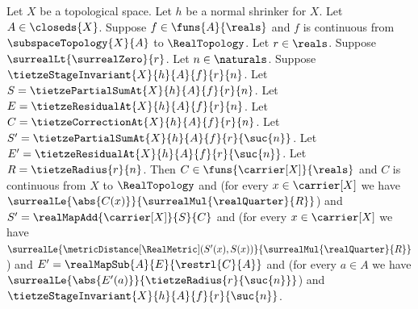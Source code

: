\begin{theorem}\label{tietze_stage_step}
    Let $X$ be a topological space.
    Let $h$ be a normal shrinker for $X$.
    Let $A\in\closeds{X}$.
    Suppose $f\in\funs{A}{\reals}$ and
        $f$ is continuous from $\subspaceTopology{X}{A}$ to
            $\RealTopology$.
    Let $r\in\reals$.
    Suppose $\surrealLt{\surrealZero}{r}$.
    Let $n\in\naturals$.
    Suppose $\tietzeStageInvariant{X}{h}{A}{f}{r}{n}$.
    Let $S=\tietzePartialSumAt{X}{h}{A}{f}{r}{n}$.
    Let $E=\tietzeResidualAt{X}{h}{A}{f}{r}{n}$.
    Let $C=\tietzeCorrectionAt{X}{h}{A}{f}{r}{n}$.
    Let $S'=\tietzePartialSumAt{X}{h}{A}{f}{r}{\suc{n}}$.
    Let $E'=\tietzeResidualAt{X}{h}{A}{f}{r}{\suc{n}}$.
    Let $R=\tietzeRadius{r}{n}$.
    Then $C\in\funs{\carrier[X]}{\reals}$ and
        $C$ is continuous from $X$ to $\RealTopology$ and
        (for every $x\in\carrier[X]$ we have
            $\surrealLe{\abs{C(x)}}
                {\surrealMul{\realQuarter}{R}}$) and
        $S'=\realMapAdd{\carrier[X]}{S}{C}$ and
        (for every $x\in\carrier[X]$ we have
            $\surrealLe{\metricDistance[\RealMetric](S'(x),S(x))}
                {\surrealMul{\realQuarter}{R}}$) and
        $E'=\realMapSub{A}{E}{\restrl{C}{A}}$ and
        (for every $a\in A$ we have
            $\surrealLe{\abs{E'(a)}}
                {\tietzeRadius{r}{\suc{n}}}$) and
        $\tietzeStageInvariant{X}{h}{A}{f}{r}{\suc{n}}$.
\end{theorem}
